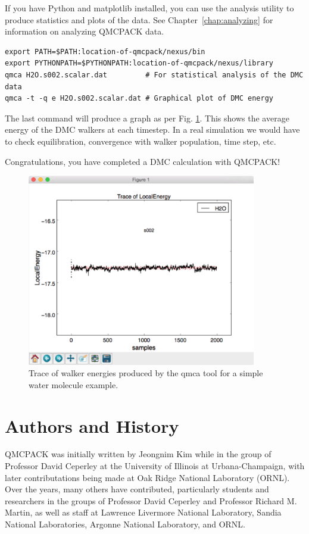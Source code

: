 If you have Python and matplotlib installed, you can use the
 analysis utility to produce statistics and plots of the
data. See Chapter~\ref{chap:analyzing} for information on analyzing
QMCPACK data.
\begin{verbatim}
export PATH=$PATH:location-of-qmcpack/nexus/bin 
export PYTHONPATH=$PYTHONPATH:location-of-qmcpack/nexus/library
qmca H2O.s002.scalar.dat         # For statistical analysis of the DMC data
qmca -t -q e H2O.s002.scalar.dat # Graphical plot of DMC energy
\end{verbatim}

The last command will produce a graph as per
Fig. \ref{fig:quick_qmca_dmc_trace}. This shows the average energy of
the DMC walkers at each timestep. In a real simulation we would have
to check equilibration, convergence with walker population, time step, etc.

Congratulations, you have completed a DMC calculation with QMCPACK!

\begin{figure}
  \centering
  \includegraphics[width=10cm]{./figures/quick_qmca_dmc_trace.png}
  \caption{Trace of walker energies produced by the qmca tool for a simple
    water molecule example.}
  \label{fig:quick_qmca_dmc_trace}
\end{figure}

\section{Authors and History}
\label{sec:history}
QMCPACK was initially written by Jeongnim Kim while in the group of
Professor David Ceperley at the University of Illinois at
Urbana-Champaign, with later contributations being made at Oak Ridge National Laboratory (ORNL). Over the years, many others have contributed, particularly
students and researchers in the groups of Professor David Ceperley
and Professor Richard M. Martin, as well as staff at Lawrence Livermore
National Laboratory, Sandia National Laboratories, Argonne National
Laboratory, and ORNL.

